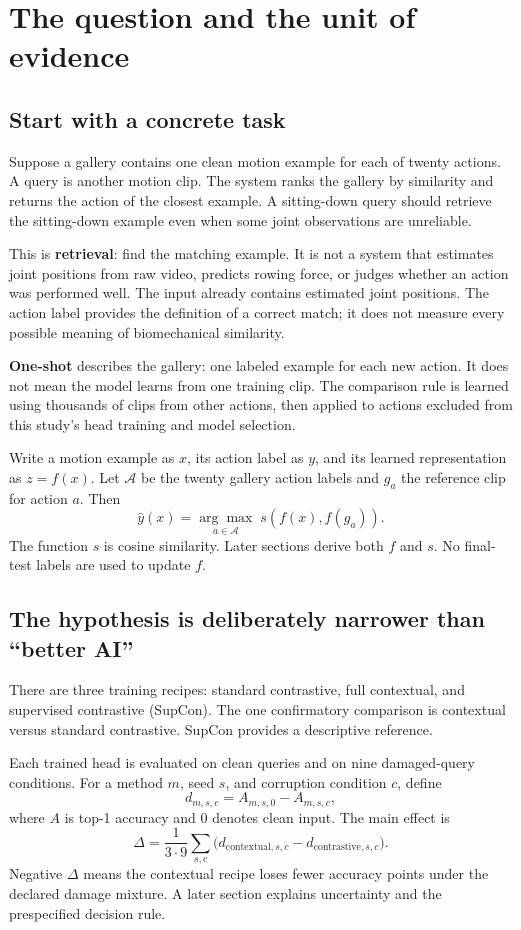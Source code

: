 \clearpage
\section{The question and the unit of evidence}\label{sec:question}
\subsection{Start with a concrete task}
Suppose a gallery contains one clean motion example for each of twenty actions.
A query is another motion clip. The system ranks the gallery by similarity and
returns the action of the closest example. A sitting-down query should retrieve
the sitting-down example even when some joint observations are unreliable.

This is \textbf{retrieval}: find the matching example. It is not a system that
estimates joint positions from raw video, predicts rowing force, or judges
whether an action was performed well. The input already contains estimated
joint positions. The action label provides the definition of a correct match;
it does not measure every possible meaning of biomechanical similarity.

\textbf{One-shot} describes the gallery: one labeled example for each new
action. It does not mean the model learns from one training clip. The comparison
rule is learned using thousands of clips from other actions, then applied to
actions excluded from this study's head training and model selection.

Write a motion example as $x$, its action label as $y$, and its learned
representation as $z=f(x)$. Let $\mathcal A$ be the twenty gallery action labels
and $g_a$ the reference clip for action $a$. Then
\[
 \widehat y(x)=\underset{a\in\mathcal A}{\arg\max}\;s(f(x),f(g_a)).
\]
The function $s$ is cosine similarity. Later sections derive both $f$ and $s$.
No final-test labels are used to update $f$.

\subsection{The hypothesis is deliberately narrower than ``better AI''}
There are three training recipes: standard contrastive, full contextual, and
supervised contrastive (SupCon). The one confirmatory comparison is contextual
versus standard contrastive. SupCon provides a descriptive reference.

Each trained head is evaluated on clean queries and on nine damaged-query
conditions. For a method $m$, seed $s$, and corruption condition $c$, define
\[
 d_{m,s,c}=A_{m,s,0}-A_{m,s,c},
\]
where $A$ is top-1 accuracy and $0$ denotes clean input. The main effect is
\[
 \Delta=\frac{1}{3\cdot9}\sum_{s,c}
       \bigl(d_{\mathrm{contextual},s,c}-d_{\mathrm{contrastive},s,c}\bigr).
\]
Negative $\Delta$ means the contextual recipe loses fewer accuracy points under
the declared damage mixture. A later section explains uncertainty and the
prespecified decision rule.

